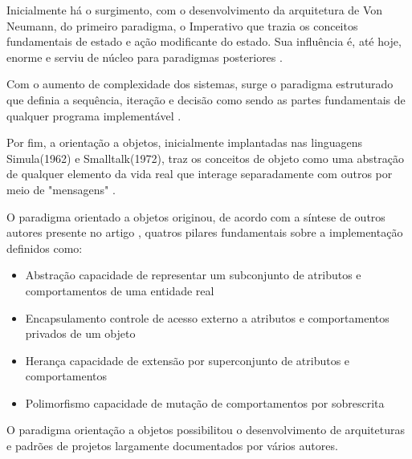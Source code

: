     Inicialmente há o surgimento, com o desenvolvimento da arquitetura de Von Neumann,
    do primeiro paradigma, o Imperativo que trazia os conceitos fundamentais de estado
    e ação modificante do estado. Sua influência é, até hoje, enorme e serviu de núcleo
    para paradigmas posteriores \textcite[p.~1]{jungthon2009paradigmas}.

    Com o aumento de complexidade dos sistemas, surge o paradigma estruturado que definia
    a sequência, iteração e decisão como sendo as partes fundamentais de qualquer programa
    implementável \textcite{Dijkstra1972structured}.

    Por fim, a orientação a objetos, inicialmente implantadas nas linguagens Simula(1962) e
    Smalltalk(1972), traz os conceitos de objeto como uma abstração de qualquer elemento
    da vida real que interage separadamente com outros por meio de "mensagens"
    \textcite[p.~52-55]{rentsch1982object}.

    O paradigma orientado a objetos originou, de acordo com a síntese de outros autores presente
    no artigo \parencite{kasture2019pillars}, quatros pilares fundamentais sobre a implementação definidos como:

    \begin{itemize}
      \item{ Abstração \- capacidade de representar um subconjunto de atributos e comportamentos de uma entidade real }
      \item{ Encapsulamento \- controle de acesso externo a atributos e comportamentos privados de um objeto }
      \item{ Herança \- capacidade de extensão por superconjunto de atributos e comportamentos }
      \item{ Polimorfismo \- capacidade de mutação de comportamentos por sobrescrita }
    \end{itemize}

    O paradigma orientação a objetos possibilitou o desenvolvimento de arquiteturas e padrões
    de projetos largamente documentados por vários autores.




%
%
%     
%
%




    
\newpage
